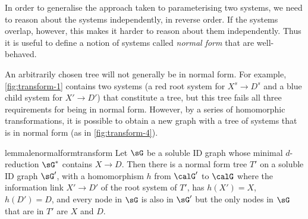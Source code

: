 
In order to generalise the approach taken to parameterising two systems, we need to reason
about the systems independently, in reverse order.
If the systems overlap, however, this 
makes it harder
to reason about them independently.
Thus it is useful to define a notion of systems called \emph{normal form} that are well-behaved.~



An arbitrarily chosen tree will not generally be in normal form. 
For example, \cref{fig:transform-1}
contains two systems (a red root system for $X^s \to D^s$
and a blue child system for $X' \to D'$) that constitute a tree, 
but this tree fails all three requirements for being in normal form.
However, by a series of homomorphic transformations,
it is possible to obtain a new graph with a tree of systems that is in normal form (as in \cref{fig:transform-4}).~



\begin{restatable}{lemma}{lenormalformtransform}
\label{le:20nov29.1-Existence-of-adequate-CID-split-from-nothing}
Let $\sG$ be a soluble ID graph whose minimal $d$-reduction $\sG^*$ contains $X\to D$. 
Then there is a 
normal form tree $T'$
on a soluble ID graph $\sG'$,
with a homomorphism $h$ from $\calG'$ to $\calG$
where the information link $X' \to D'$ of the root system of $T'$,
has $h(X')=X$, $h(D')=D$,
and every node in $\sG$ is also in $\sG'$ 
but the only nodes in $\sG$ that are in $T'$ are $X$ and $D$.~
\end{restatable}

